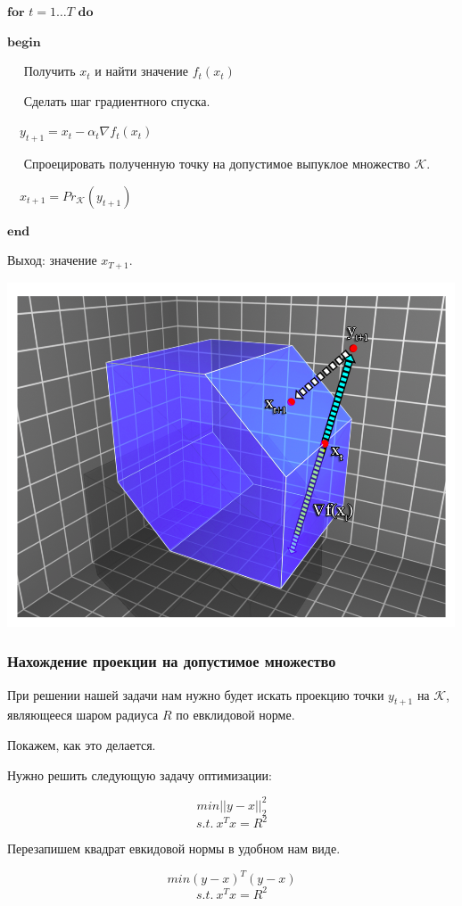 \documentclass[12pt]{article}
\theoremstyle{definition}
\begin{document}
$\textbf{for}$ $t = 1 \dots T$ $\textbf{do}$

$\textbf{begin}$

$\quad$ Получить $x_t$ и найти значение $f_t(x_t)$

$\quad$ Сделать шаг градиентного спуска.

$\quad y_{t+1} = x_t - \alpha_t \nabla f_t(x_t)$

$\quad$ Спроецировать полученную точку на допустимое выпуклое множество $\mathcal{K}$.

$\quad x_{t+1} = Pr_{\mathcal{K}}(y_{t+1})$

$\textbf{end}$

Выход: значение $x_{T+1}$.

\includegraphics[width=\linewidth]{gradient_descent.png}

\subsubsection*{Нахождение проекции на допустимое множество}

При решении нашей задачи нам нужно будет искать проекцию точки $y_{t+1}$ на $\mathcal{K}$, являющееся шаром радиуса $R$ по евклидовой норме.

Покажем, как это делается.

Нужно решить следующую задачу оптимизации:

$$min ||y-x||_2^2$$
$$s.t.\ x^Tx = R^2$$

Перезапишем квадрат евкидовой нормы в удобном нам виде.

$$min (y-x)^T(y-x)$$
$$s.t.\ x^Tx = R^2$$
\end{document}
